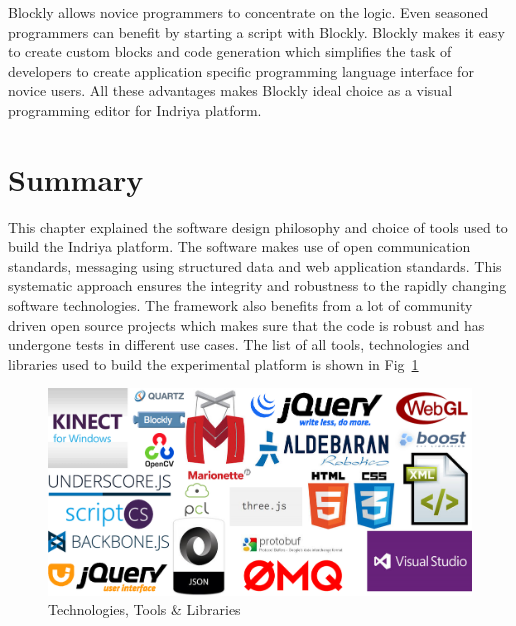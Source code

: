 Blockly allows novice programmers to concentrate on the logic. Even seasoned programmers can benefit by starting a script with Blockly. Blockly makes it easy to create custom blocks and code generation which simplifies the task of developers to create application specific programming language interface for novice users. All these advantages makes Blockly ideal choice as a visual programming editor for Indriya platform.
\section{Summary}
This chapter explained the software design philosophy and choice of tools used to build the Indriya platform. The software makes use of open communication standards, messaging using structured data and web application standards. This systematic approach ensures the integrity and robustness to the rapidly changing software technologies. The framework also benefits from a lot of community driven open source projects which makes sure that the code is robust and has undergone tests in different use cases. The list of all tools, technologies and libraries used to build the experimental platform is shown in Fig~\ref{fig:libraries_used}
\begin{figure}
\centering
\includegraphics[width=\textwidth]{assets/libs2.png}
\caption[Technologies, Tools \& Libraries]{Technologies, Tools \& Libraries}
\label{fig:libraries_used}
\end{figure}
